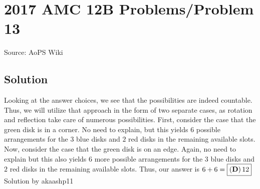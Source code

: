 \documentclass[12pt]{article}
\begin{document}
\section*{{2017 AMC 12B Problems/Problem 13}}
Source: AoPS Wiki

\subsection*{Solution}
Looking at the answer choices, we see that the possibilities are indeed countable. Thus, we will utilize that approach in the form of two separate cases, as rotation and reflection take care of numerous possibilities. First, consider the case that the green disk is in a corner. No need to explain, but this yields $6$ possible arrangements for the $3$ blue disks and $2$ red disks in the remaining available slots. Now, consider the case that the green disk is on an edge. Again, no need to explain but this also yields $6$ more possible arrangements for the $3$ blue disks and $2$ red disks in the remaining available slots. Thus, our answer is $6 + 6 = \boxed{\bold{(D)}\, 12}$ Solution by akaashp11
\end{document}
